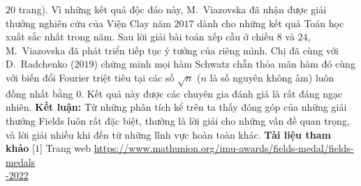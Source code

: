 \begin{multicols}{2}
$20$ trang). Vì những kết quả độc đáo này, M.~Viazovska đã nhận được giải thưởng nghiên cứu của Viện Clay năm $2017$ dành cho những kết quả Toán học xuất sắc nhất trong năm.        
	\vskip 0.05cm
	Sau lời giải bài toán xếp cầu ở chiều $8$ và $24$, M.~Viazovska đã phát triển tiếp tục ý tưởng của riêng mình. Chị đã cùng với D.~Radchenko ($2019$) chứng minh mọi hàm Schwatz chẵn thỏa mãn hàm đó cùng với biến đổi Fourier triệt tiêu tại các số $\sqrt{n}$ ($n$ là số nguyên không âm) luôn đồng nhất bằng $0$. Kết quả này được các chuyên gia đánh giá là rất đáng ngạc nhiên.
	\vskip 0.05cm
	{\bf\color{duongvaotoanhoc} Kết luận:}  Từ những phân tích kể trên ta thấy đóng góp của những giải thưởng Fields luôn rất đặc biệt, thường là lời giải cho những vấn đề quan trọng, và lời giải nhiều khi đến từ những lĩnh vực hoàn toàn khác.
	\vskip 0.05cm
	\textbf{\color{duongvaotoanhoc}Tài liệu tham khảo}
	\vskip 0.05cm
	[$1$] Trang web \url{https://www.mathunion.org/imu-awards/fields-medal/fields-medals}\\ \url{-2022}
	\vskip 0.05cm
\end{multicols}
